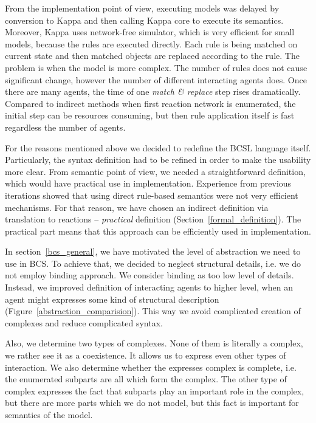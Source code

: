 \documentclass[12pt]{fithesis2}
\begin{document}
From the implementation point of view, executing models was delayed by conversion to Kappa and then calling Kappa core to execute its semantics. Moreover, Kappa uses network-free simulator, which is very efficient for small models, because the rules are executed directly. Each rule is being matched on current state and then matched objects are replaced according to the rule. The problem is when the model is more complex. The number of rules does not cause significant change, however the number of different interacting agents does. Once there are many agents, the time of one \emph{match \& replace} step rises dramatically. Compared to indirect methods when first reaction network is enumerated, the initial step can be resources consuming, but then rule application itself is fast regardless the number of agents.

For the reasons mentioned above we decided to redefine the BCSL language itself. Particularly, the syntax definition had to be refined in order to make the usability more clear. From semantic point of view, we needed a straightforward definition, which would have practical use in implementation. Experience from previous iterations showed that using direct rule-based semantics were not very efficient mechanisms. For that reason, we have chosen an indirect definition via translation to reactions -- \emph{practical} definition (Section~\ref{formal_definition}). The practical part means that this approach can be efficiently used in implementation.

In section~\ref{bcs_general}, we have motivated the level of abstraction we need to use in BCS. To achieve that, we decided to neglect structural details, i.e. we do not employ binding approach. We consider binding as too low level of details. Instead, we improved definition of interacting agents to higher level, when an agent might expresses some kind of structural description (Figure~\ref{abstraction_comparision}). This way we avoid complicated creation of complexes and reduce complicated syntax.

Also, we determine two types of complexes. None of them is literally a complex, we rather see it as a coexistence. It allows us to express even other types of interaction. We also determine whether the expresses complex is complete, i.e. the enumerated subparts are all which form the complex. The other type of complex expresses the fact that subparts play an important role in the complex, but there are more parts which we do not model, but this fact is important for semantics of the model.
\end{document}
